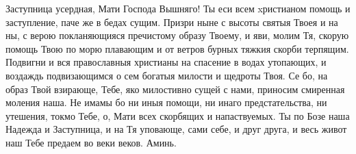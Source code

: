 \mychapterending

\begin{mymulticols}


Заступница усердная, Мати Господа Вышняго! Ты еси всем xристианом помощь и заступление, паче же в бедах сущим. Призри ныне с высоты святыя Твоея и на ны, с верою покланяющияся пречистому образу Твоему, и яви, молим Тя, скорую помощь Твою по морю плавающим и от ветров бурных тяжкия скорби терпящим. Подвигни и вся православныя христианы на спасение в водах утопающих, и воздаждь подвизающимся о сем богатыя милости и щедроты Твоя. Се бо, на образ Твой взирающе, Тебе, яко милостивно сущей с нами, приносим смиренная моления наша. Не имамы бо ни иныя помощи, ни инаго предстательства, ни утешения, токмо Тебе, о, Мати всех скорбящих и напаствуемых. Ты по Бозе наша Надежда и Заступница, и на Тя уповающе, сами себе, и друг друга, и весь живот наш Тебе предаем во веки веков. Аминь.

\end{mymulticols}

\mychapterending

